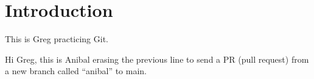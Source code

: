 
\section{Introduction} \label{s:introduction}

This is Greg practicing Git.

Hi Greg, this is Anibal erasing the previous line to send a PR (pull request) from a new branch called ``anibal'' to main.
